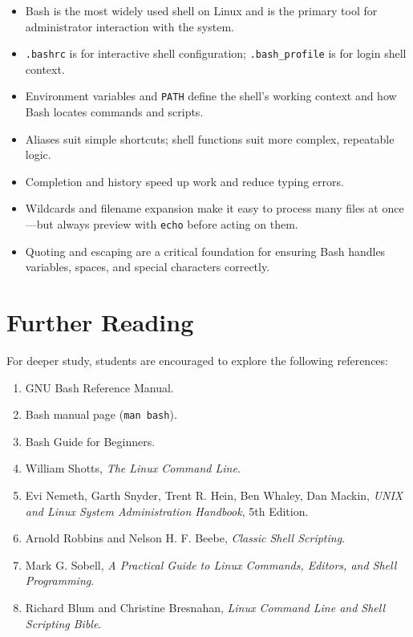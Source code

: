\begin{itemize}
  \item Bash is the most widely used shell on Linux and is the primary tool
    for administrator interaction with the system.
  \item \texttt{.bashrc} is for interactive shell configuration; \texttt{.bash\_profile}
    is for login shell context.
  \item Environment variables and \texttt{PATH} define the shell's working
    context and how Bash locates commands and scripts.
  \item Aliases suit simple shortcuts; shell functions suit more complex,
    repeatable logic.
  \item Completion and history speed up work and reduce typing errors.
  \item Wildcards and filename expansion make it easy to process many files
    at once---but always preview with \texttt{echo} before acting on them.
  \item Quoting and escaping are a critical foundation for ensuring Bash
    handles variables, spaces, and special characters correctly.
\end{itemize}

\section{Further Reading}
\label{sec:bash-references}

For deeper study, students are encouraged to explore the following references:

\begin{enumerate}
  \item GNU Bash Reference Manual.
  \item Bash manual page (\texttt{man bash}).
  \item Bash Guide for Beginners.
  \item William Shotts, \textit{The Linux Command Line}.
  \item Evi Nemeth, Garth Snyder, Trent R. Hein, Ben Whaley, Dan Mackin,
    \textit{UNIX and Linux System Administration Handbook}, 5th Edition.
  \item Arnold Robbins and Nelson H. F. Beebe,
    \textit{Classic Shell Scripting}.
  \item Mark G. Sobell,
    \textit{A Practical Guide to Linux Commands, Editors, and Shell Programming}.
  \item Richard Blum and Christine Bresnahan,
    \textit{Linux Command Line and Shell Scripting Bible}.
\end{enumerate}
